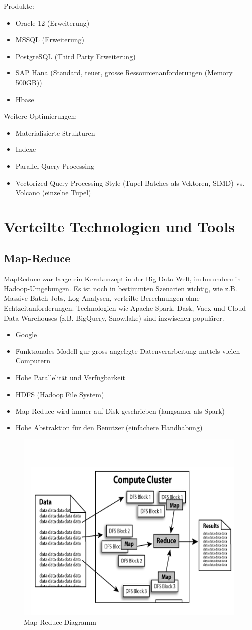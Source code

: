 \documentclass[../Main.tex]{subfiles}
\begin{document}
Produkte:
\begin{itemize}
    \item Oracle 12 (Erweiterung)
    \item MSSQL (Erweiterung)
    \item PostgreSQL (Third Party Erweiterung)
    \item SAP Hana (Standard, teuer, grosse Ressourcenanforderungen (Memory 500GB))
    \item Hbase
\end{itemize}

Weitere Optimierungen:
\begin{itemize}
    \item Materialisierte Strukturen
    \item Indexe
    \item Parallel Query Processing
    \item Vectorized Query Processing Style (Tupel Batches als Vektoren, SIMD) vs. Volcano (einzelne Tupel)
\end{itemize}

\section{Verteilte Technologien und Tools}
\subsection{Map-Reduce}
MapReduce war lange ein Kernkonzept in der Big-Data-Welt, insbesondere in Hadoop-Umgebungen.
Es ist noch in bestimmten Szenarien wichtig, wie z.B. Massive Batch-Jobs, Log
Analysen, verteilte Berechnungen ohne Echtzeitanforderungen.
Technologien wie Apache Spark, Dask, Vaex und Cloud-Data-Warehouses (z.B. 
BigQuery, Snowflake) sind inzwischen populärer.
\begin{itemize}
    \item Google
    \item Funktionales Modell gür gross angelegte Datenverarbeitung mittels vielen Computern
    \item Hohe Parallelität und Verfügbarkeit
    \item HDFS (Hadoop File System)
    \item Map-Reduce wird immer auf Disk geschrieben (langsamer als Spark)
    \item Hohe Abstraktion für den Benutzer (einfachere Handhabung)
\end{itemize}

\begin{figure}[H]
    \centering
    \includegraphics[width=0.5\linewidth]{Images/map-reduce.png}
    \caption{Map-Reduce Diagramm}
\end{figure}
\end{document}
